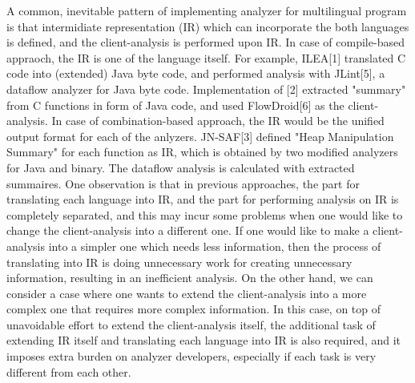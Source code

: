 A common, inevitable pattern of implementing analyzer for multilingual program
is that intermidiate representation (IR) which can incorporate the both
languages is defined, and the client-analysis is performed upon IR. In case of
compile-based appraoch, the IR is one of the language itself. For example, ILEA[1]
translated C code into (extended) Java byte code, and performed analysis with
JLint[5], a dataflow analyzer for Java byte code. Implementation of [2] extracted
"summary" from C functions in form of Java code, and used FlowDroid[6] as the
client-analysis. In case of combination-based approach, the IR would be the unified
output format for each of the anlyzers. JN-SAF[3] defined "Heap Manipulation Summary"
for each function as IR, which is obtained by two modified analyzers for Java
and binary. The dataflow analysis is calculated with extracted summaires.  One
observation is that in previous approaches, the part for translating each
language into IR, and the part for performing analysis on IR is completely
separated, and this may incur some problems when one would like to change the
client-analysis into a different one. If one would like to make a
client-analysis into a simpler one which needs less information, then the
process of translating into IR is doing unnecessary work for creating
unnecessary information, resulting in an inefficient analysis. On the other
hand, we can consider a case where one wants to extend the client-analysis into
a more complex one that requires more complex information. In this case, on top
of unavoidable effort to extend the client-analysis itself, the additional task
of extending IR itself and translating each language into IR is also required,
and it imposes extra burden on analyzer developers, especially if each task is
very different from each other.

